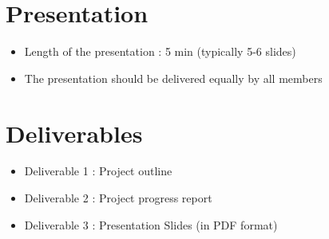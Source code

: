 \documentclass[12pt]{article}
\begin{document}
\section*{Presentation}
\begin{itemize}
    \item Length of the presentation : 5 min (typically 5-6 slides)
    \item The presentation should be delivered equally by all members

\end{itemize}

\section*{Deliverables}
\begin{itemize}
    \item Deliverable 1 : Project outline 
    \item Deliverable 2 : Project progress report
    \item Deliverable 3 : Presentation Slides (in PDF format)
\end{itemize}
\end{document}

